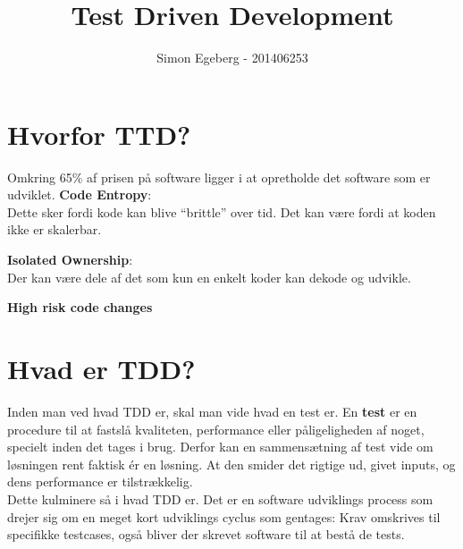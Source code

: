 \documentclass{article}
\title{Test Driven Development}
\author{Simon Egeberg - 201406253}
\begin{document}
\maketitle
\section{Hvorfor TTD?}
Omkring 65\% af prisen på software ligger i at opretholde det software som er udviklet.
\textbf{Code Entropy}:\\
Dette sker fordi kode kan blive ``brittle'' over tid. Det kan være fordi at koden ikke er skalerbar.

\textbf{Isolated Ownership}:\\
Der kan være dele af det som kun en enkelt koder kan dekode og udvikle. 

\textbf{High risk code changes}

\section{Hvad er TDD?}
Inden man ved hvad TDD er, skal man vide hvad en test er. En \textbf{test} er en procedure til at fastslå kvaliteten, performance eller påligeligheden af noget, specielt inden det tages i brug.
Derfor kan en sammensætning af test vide om løsningen rent faktisk ér en løsning. At den smider det rigtige ud, givet inputs, og dens performance er tilstrækkelig. \\

Dette kulminere så i hvad TDD er. Det er en software udviklings process som drejer sig om en meget kort udviklings cyclus som gentages: Krav omskrives til specifikke testcases, også bliver der skrevet software til at bestå de tests.
\end{document}
